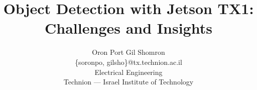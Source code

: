 \documentclass{sig-alternate}
\title{Object Detection with Jetson TX1:\\Challenges and Insights}
\author{
  {
  Oron Port\hspace{10 mm}
  Gil Shomron}\\[0mm]
  \{soronpo, gilsho\}@tx.technion.ac.il\\[0mm]
  Electrical Engineering\\[0mm]
  Technion --- Israel Institute of Technology
}
\begin{document}
\maketitle
\thispagestyle{firstpage}
\pagestyle{plain}




\begin{abstract}



\end{abstract}














\end{document}
